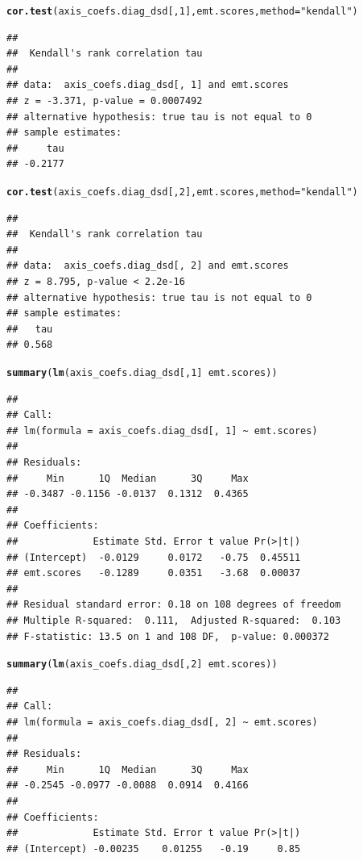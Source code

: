 \documentclass{article}\usepackage[]{graphicx}\usepackage[]{color}
\makeatletter
\newcommand{\hlnum}[1]{\textcolor[rgb]{0.686,0.059,0.569}{#1}}%
\newcommand{\hlstr}[1]{\textcolor[rgb]{0.192,0.494,0.8}{#1}}%
\newcommand{\hlopt}[1]{\textcolor[rgb]{0,0,0}{#1}}%
\newcommand{\hlstd}[1]{\textcolor[rgb]{0.345,0.345,0.345}{#1}}%
\newcommand{\hlkwc}[1]{\textcolor[rgb]{0.333,0.667,0.333}{#1}}%
\newcommand{\hlkwd}[1]{\textcolor[rgb]{0.737,0.353,0.396}{\textbf{#1}}}%
\newenvironment{kframe}{%
 \def\at@end@of@kframe{}%
 \ifinner\ifhmode%
  \def\at@end@of@kframe{\end{minipage}}%
  \begin{minipage}{\columnwidth}%
 \fi\fi%
 \def\FrameCommand##1{\hskip\@totalleftmargin \hskip-\fboxsep
 \colorbox{shadecolor}{##1}\hskip-\fboxsep
     \hskip-\linewidth \hskip-\@totalleftmargin \hskip\columnwidth}%
 \MakeFramed {\advance\hsize-\width
   \@totalleftmargin\z@ \linewidth\hsize
   \@setminipage}}%
 {\par\unskip\endMakeFramed%
 \at@end@of@kframe}
\newenvironment{knitrout}{}{} %
\makeatother
\begin{document}
\begin{knitrout}
\begin{kframe}\begin{alltt}
\hlkwd{cor.test}\hlstd{(axis_coefs.diag_dsd[,}\hlnum{1}\hlstd{], emt.scores,} \hlkwc{method} \hlstd{=} \hlstr{"kendall"}\hlstd{)}
\end{alltt}
\begin{verbatim}
## 
## 	Kendall's rank correlation tau
## 
## data:  axis_coefs.diag_dsd[, 1] and emt.scores
## z = -3.371, p-value = 0.0007492
## alternative hypothesis: true tau is not equal to 0
## sample estimates:
##     tau 
## -0.2177
\end{verbatim}
\begin{alltt}
\hlkwd{cor.test}\hlstd{(axis_coefs.diag_dsd[,}\hlnum{2}\hlstd{], emt.scores,} \hlkwc{method} \hlstd{=} \hlstr{"kendall"}\hlstd{)}
\end{alltt}
\begin{verbatim}
## 
## 	Kendall's rank correlation tau
## 
## data:  axis_coefs.diag_dsd[, 2] and emt.scores
## z = 8.795, p-value < 2.2e-16
## alternative hypothesis: true tau is not equal to 0
## sample estimates:
##   tau 
## 0.568
\end{verbatim}
\begin{alltt}
\hlkwd{summary}\hlstd{(}\hlkwd{lm}\hlstd{(axis_coefs.diag_dsd[,}\hlnum{1}\hlstd{]} \hlopt{~} \hlstd{emt.scores))}
\end{alltt}
\begin{verbatim}
## 
## Call:
## lm(formula = axis_coefs.diag_dsd[, 1] ~ emt.scores)
## 
## Residuals:
##     Min      1Q  Median      3Q     Max 
## -0.3487 -0.1156 -0.0137  0.1312  0.4365 
## 
## Coefficients:
##             Estimate Std. Error t value Pr(>|t|)
## (Intercept)  -0.0129     0.0172   -0.75  0.45511
## emt.scores   -0.1289     0.0351   -3.68  0.00037
## 
## Residual standard error: 0.18 on 108 degrees of freedom
## Multiple R-squared:  0.111,	Adjusted R-squared:  0.103 
## F-statistic: 13.5 on 1 and 108 DF,  p-value: 0.000372
\end{verbatim}
\begin{alltt}
\hlkwd{summary}\hlstd{(}\hlkwd{lm}\hlstd{(axis_coefs.diag_dsd[,}\hlnum{2}\hlstd{]} \hlopt{~} \hlstd{emt.scores))}
\end{alltt}
\begin{verbatim}
## 
## Call:
## lm(formula = axis_coefs.diag_dsd[, 2] ~ emt.scores)
## 
## Residuals:
##     Min      1Q  Median      3Q     Max 
## -0.2545 -0.0977 -0.0088  0.0914  0.4166 
## 
## Coefficients:
##             Estimate Std. Error t value Pr(>|t|)
## (Intercept) -0.00235    0.01255   -0.19     0.85

\end{verbatim}
\end{kframe}
\end{knitrout}
\end{document}
